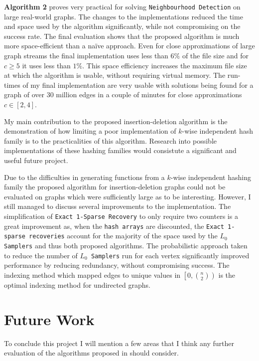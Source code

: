\documentclass[11pt,twoside,a4paper]{report}
\begin{document}
\textbf{Algorithm 2} proves very practical for solving \texttt{Neighbourhood Detection} on large real-world graphs. The changes to the implementations reduced the time and space used by the algorithm significantly, while not compromising on the success rate. The final evaluation shows that the proposed algorithm is much more space-efficient than a naïve approach. Even for close approximations of large graph streams the final implementation uses less than $6\%$ of the file size and for $c\geq5$ it uses less than $1\%$. This space efficiency increases the maximum file size at which the algorithm is usable, without requiring virtual memory. The run-times of my final implementation are very usable with solutions being found for a graph of over 30 million edges in a couple of minutes for close approximations $c\in[2,4]$.
\par My main contribution to the proposed insertion-deletion algorithm is the demonstration of how limiting a poor implementation of $k$-wise independent hash family is to the practicalities of this algorithm. Research into possible implementations of these hashing families would consistute a significant and useful future project.
\par Due to the difficulties in generating functions from a $k$-wise independent hashing family the proposed algorithm for insertion-deletion graphs could not be evaluated on graphs which were sufficiently large as to be interesting. However, I still managed to discuss several improvements to the implementation. The simplification of \texttt{Exact 1-Sparse Recovery} to only require two counters is a great improvement as, when the \texttt{hash arrays} are discounted, the \texttt{Exact 1-sparse recoveries} account for the majority of the space used by the \texttt{$L_0$ Samplers} and thus both proposed algorithms. The probabilistic approach taken to reduce the number of \texttt{$L_0$ Samplers} run for each vertex significantly improved performance by reducing redundancy, without compromising success. The indexing method which mapped edges to unique values in $\left[0,{n\choose2}\right)$ is the optimal indexing method for undirected graphs.

\section{Future Work}

To conclude this project I will mention a few areas that I think any further evaluation of the algorithms proposed in \cite{orig} should consider.
\end{document}
